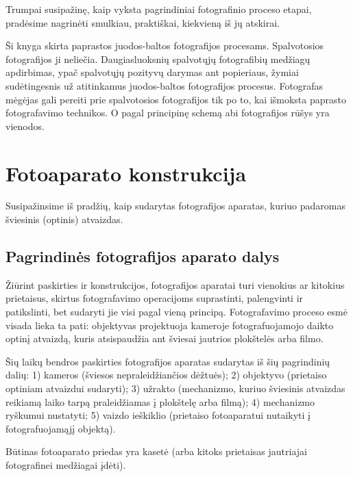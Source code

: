 \documentclass[12pt]{book}
\begin{document}
			Trumpai susipažinę, kaip vyksta pagrindiniai fotografinio proceso etapai, pradėsime nagrinėti smulkiau, praktiškai, kiekvieną iš jų atskirai.

			Ši knyga skirta paprastos juodos-baltos fotografijos procesams. Spalvotosios fotografijos ji neliečia. Daugiasluoksnių spalvotųjų fotografibių medžiagų apdirbimas, ypač spalvotųjų pozityvų darymas ant popieriaus, žymiai sudėtingesnis už atitinkamus juodos-baltos fotografijos procesus. Fotografas mėgėjas gali pereiti prie spalvotosios fotografijos tik po to, kai išmoksta paprasto fotografavimo technikos. O pagal principinę schemą abi fotografijos rūšys yra vienodos.
		\section*{Fotoaparato konstrukcija}
			Susipažinsime iš pradžių, kaip sudarytas fotografijos aparatas, kuriuo padaromas šviesinis (optinis) atvaizdas.
			\subsection*{Pagrindinės fotografijos aparato dalys}
				Žiūrint paskirties ir konstrukcijos, fotografijos aparatai turi vienokius ar kitokius prietaisus, skirtus fotografavimo operacijoms suprastinti, palengvinti ir patikslinti, bet sudaryti jie visi pagal vieną principą. Fotografavimo proceso esmė visada lieka ta pati: objektyvas projektuoja kameroje fotografuojamojo daikto optinį atvaizdą, kuris atsispaudžia ant šviesai jautrios plokštelės arba filmo.

				Šių laikų bendros paskirties fotografijos aparatas sudarytas iš šių pagrindinių dalių: 1) kameros (šviesos nepraleidžiančios dėžtuės); 2) objektyvo (prietaiso optiniam atvaizdui sudaryti); 3) užrakto (mechanizmo, kuriuo šviesinis atvaizdas reikiamą laiko tarpą praleidžiamas į plokštelę arba filmą); 4) mechanizmo ryškumui nustatyti; 5) vaizdo ieškiklio (prietaiso fotoaparatui nutaikyti į fotografuojamąjį objektą).

				Būtinas fotoaparato priedas yra kasetė (arba kitoks prietaisas jautriajai fotografinei medžiagai įdėti).
\end{document}
